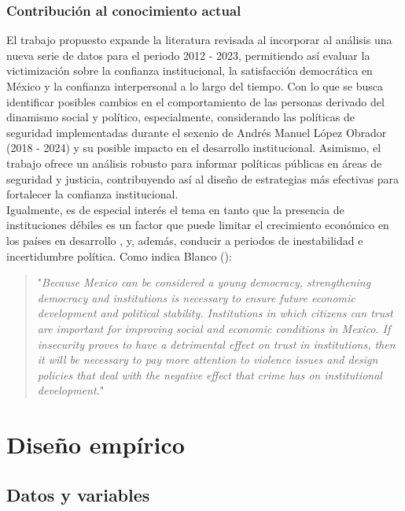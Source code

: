 \documentclass[letterpaper]{article}
\begin{document}
\subsubsection{Contribución al conocimiento actual}

El trabajo propuesto expande la literatura revisada al incorporar al análisis una nueva serie de datos para el periodo 2012 - 2023, permitiendo así evaluar la victimización sobre la confianza institucional, la satisfacción democrática en México y la confianza interpersonal a lo largo del tiempo. Con lo que se busca identificar posibles cambios en el comportamiento de las personas derivado del dinamismo social y político, especialmente, considerando las políticas de seguridad implementadas durante el sexenio de Andrés Manuel López Obrador (2018 - 2024) y su posible impacto en el desarrollo institucional. Asimismo, el trabajo ofrece un análisis robusto para informar políticas públicas en áreas de seguridad y justicia, contribuyendo así al diseño de estrategias más efectivas para fortalecer la confianza institucional.\\[-1.5em] 

Igualmente, es de especial interés el tema en tanto que la presencia de instituciones débiles es un factor que puede limitar el crecimiento económico en los países en desarrollo \autocite{acemoglu2003, blanco2013}, y, además, conducir a periodos de inestabilidad e incertidumbre política. Como indica Blanco (\citeyear{blanco2012, blanco2013b}):

\begin{quote}
"\emph{Because Mexico can be considered a young democracy, strengthening democracy and institutions is necessary to ensure future economic development and political stability. Institutions in which citizens can trust are important for improving social and economic conditions in Mexico. If insecurity proves to have a detrimental effect on trust in institutions, then it will be necessary to pay more attention to violence issues and design policies that deal with the negative effect that crime has on institutional development.}"
\end{quote}

\vspace{-0.7cm}

\section{Diseño empírico}

\subsection{Datos y variables} 
\end{document}
